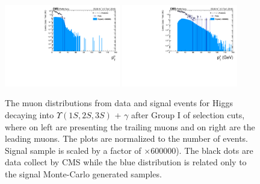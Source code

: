 


\begin{figure}[!htbp]
\begin{center}
\includegraphics[width=0.45\textwidth]{figures_and_tables/outputPlots/HtoUpsilon_Cat0_ZZZZZ/nEvts/data_x_mc/withKinCuts/h_withKin_TrailingMu_pt}\hspace*{1.cm}
\includegraphics[width=0.45\textwidth]{figures_and_tables/outputPlots/HtoUpsilon_Cat0_ZZZZZ/nEvts/data_x_mc/withKinCuts/h_withKin_LeadingMu_pt}
\end{center}\vspace*{-.5cm}
\caption{The \PT muon distributions from data and signal events for Higgs decaying into $\Upsilon(1S,2S,3S)$ + $\gamma$ after Group I of selection cuts, where on left are presenting the trailing muons and on right are the leading muons. The plots are normalized to the number of events. Signal sample is scaled by a factor of $\times 600000$). The black dots are data collect by CMS while the blue distribution is related only to the signal Monte-Carlo generated samples.}
\label{fig:pTMuons_HtoUpsilon_Cat0_groupI_plus_II}
\end{figure}


